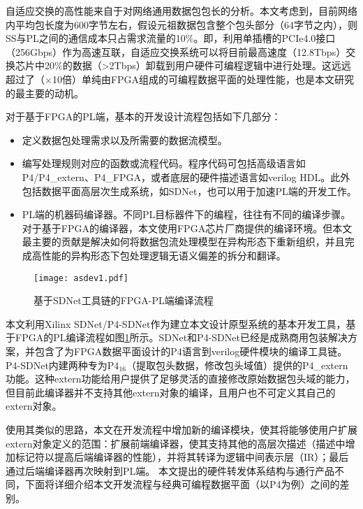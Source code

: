 自适应交换的高性能来自于对网络通用数据包包长的分析。本文考虑到，目前网络内平均包长度为600字节左右，假设元祖数据包含整个包头部分（64字节之内），则SS与PL之间的通信成本只占需求流量的10\%。即，利用单插槽的PCIe4.0接口（256Gbps）作为高速互联，自适应交换系统可以将目前最高速度（12.8Tbps）交换芯片中20\%的数据（>2Tbps）卸载到用户硬件可编程逻辑中进行处理。这远远超过了（$\times$10倍）单纯由FPGA组成的可编程数据平面的处理性能，也是本文研究的最主要的动机。

\label{chap432}

对于基于FPGA的PL端，基本的开发设计流程包括如下几部分：

\begin{itemize}
	\item 定义数据包处理需求以及所需要的数据流模型。
	\item 编写处理规则对应的函数或流程代码。程序代码可包括高级语言如P4/P4\_extern、P4\_FPGA，或者底层的硬件描述语言如verilog HDL。此外包括数据平面高层次生成系统，如SDNet，也可以用于加速PL端的开发工作。
	\item PL端的机器码编译器。不同PL目标器件下的编程，往往有不同的编译步骤。对于基于FPGA的编译器，本文使用FPGA芯片厂商提供的编译环境。但本文最主要的贡献是解决如何将数据包流处理模型在异构形态下重新组织，并且完成高性能的异构形态下包处理逻辑无语义偏差的拆分和翻译。
\end{itemize}

\begin{figure}[!ht]
	\centering 
	\vspace{-1.5mm} 
	\texttt{[image: asdev1.pdf]}
	\caption{基于SDNet工具链的FPGA-PL端编译流程} \label{fig:asdev}
\end{figure}

本文利用Xilinx SDNet/P4-SDNet作为建立本文设计原型系统的基本开发工具，基于FPGA的PL编译流程如图\ref{fig:asdev}所示。SDNet和P4-SDNet已经是成熟商用包装解决方案，并包含了为FPGA数据平面设计的P4语言到verilog硬件模块的编译工具链。P4-SDNet内建两种专为P4$ _{16} $（提取包头数据，修改包头域值）提供的P4\_extern功能。这种extern功能给用户提供了足够灵活的直接修改原始数据包头域的能力，但目前此编译器并不支持其他extern对象的编译，且用户也不可定义其自己的extern对象。

使用其类似的思路，本文在开发流程中增加新的编译模块，使其将能够使用户扩展extern对象定义的范围：扩展前端编译器，使其支持其他的高层次描述（描述中增加标记符以提高后端编译器的性能），并将其转译为逻辑中间表示层（IR）；最后通过后端编译器再次映射到PL端。
本文提出的硬件转发体系结构与通行产品不同，下面将详细介绍本文开发流程与经典可编程数据平面（以P4为例）之间的差别。

